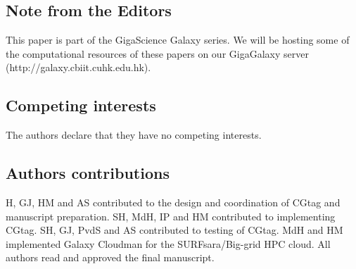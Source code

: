 \subsection*{Note from the Editors}
This paper is part of the GigaScience Galaxy series. We will be hosting some of the computational resources of these papers on our GigaGalaxy server (http://galaxy.cbiit.cuhk.edu.hk).

\subsection*{Competing interests}

The authors declare that they have no competing interests.


\subsection*{Authors contributions}

H, GJ, HM and AS contributed to the design and coordination of CGtag and manuscript preparation. SH, MdH, IP and HM contributed to implementing CGtag.  SH, GJ, PvdS and AS contributed to testing of CGtag. MdH and HM implemented Galaxy Cloudman for the SURFsara/Big-grid HPC cloud. All authors read and approved the final manuscript.




